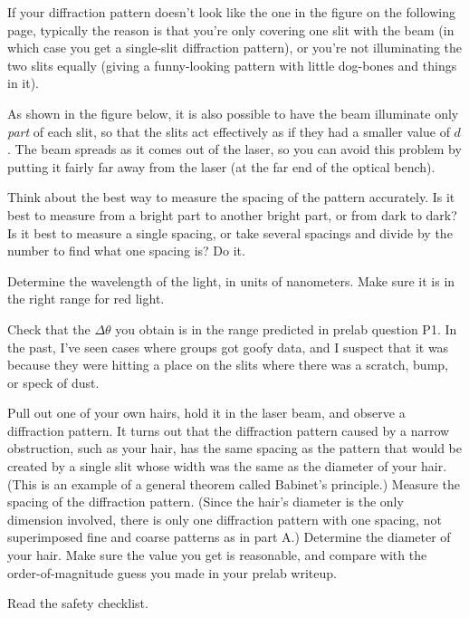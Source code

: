 If your diffraction pattern doesn't look like the
one in the figure on the following page, typically the
reason is that you're only covering one slit with the beam
(in which case you get a single-slit diffraction pattern),
or you're not illuminating the two slits equally (giving
a funny-looking pattern with little dog-bones and things in it).

As shown in the figure below, it is also possible to have the
beam illuminate only \emph{part} of each slit, so that the slits
act effectively as if they had a smaller value of $d$. The beam
spreads as it comes out of the laser, so you can avoid this
problem by putting it fairly far away from the laser (at the far
end of the optical bench).


Think about the best way to measure the spacing of the
pattern accurately. Is it best to measure from a bright part
to another bright part, or from dark to dark? Is it best to
measure a single spacing, or take several spacings and
divide by the number to find what one spacing is? Do it.

Determine the wavelength of the light, in units of
nanometers. Make sure it is in the right range for red
light.

Check that the $\Delta\theta$ you obtain is in the range
predicted in prelab question P1. In the past, I've seen
cases where groups got goofy data, and I suspect that it
was because they were hitting a place on the slits where
there was a scratch, bump, or speck of dust.


Pull out one of your own hairs, hold it in the laser beam,
and observe a diffraction pattern. It turns out that the
diffraction pattern caused by a narrow obstruction, such as
your hair, has the same spacing as the pattern that would be
created by a single slit whose width was the same as the
diameter of your hair. (This is an example of a general
theorem called Babinet's principle.) Measure the spacing of
the diffraction pattern. (Since the hair's diameter is the
only dimension involved, there is only one diffraction
pattern with one spacing, not superimposed fine and coarse
patterns as in part A.) Determine the diameter of your hair.
Make sure the value you get is reasonable, and compare with
the order-of-magnitude guess you made in your prelab writeup.

\prelab

Read the safety checklist.

